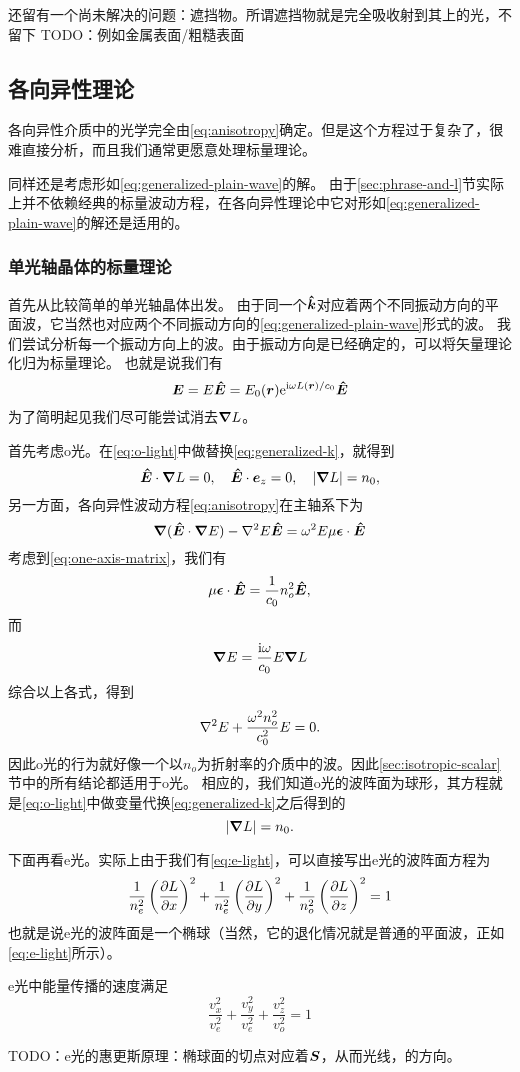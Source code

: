 \documentclass[UTF8, a4paper]{ctexart}
\newcommand*{\ii}{\mathrm{i}}
\newcommand*{\ee}{\mathrm{e}}
\begin{document}
还留有一个尚未解决的问题：遮挡物。所谓遮挡物就是完全吸收射到其上的光，不留下
TODO：例如金属表面/粗糙表面

\subsection{各向异性理论}

各向异性介质中的光学完全由\eqref{eq:anisotropy}确定。但是这个方程过于复杂了，很难直接分析，而且我们通常更愿意处理标量理论。

同样还是考虑形如\eqref{eq:generalized-plain-wave}的解。
由于\ref{sec:phrase-and-l}节实际上并不依赖经典的标量波动方程，在各向异性理论中它对形如\eqref{eq:generalized-plain-wave}的解还是适用的。

\subsubsection{单光轴晶体的标量理论}

首先从比较简单的单光轴晶体出发。
由于同一个$\vu*{k}$对应着两个不同振动方向的平面波，它当然也对应两个不同振动方向的\eqref{eq:generalized-plain-wave}形式的波。
我们尝试分析每一个振动方向上的波。由于振动方向是已经确定的，可以将矢量理论化归为标量理论。
也就是说我们有
\[
    \vb*{E} = E \vu*{E} = E_0(\vb*{r}) \ee^{\ii \omega L(\vb*{r}) / c_0} \vu*{E}
\]
为了简明起见我们尽可能尝试消去$\grad{L}$。

首先考虑o光。在\eqref{eq:o-light}中做替换\eqref{eq:generalized-k}，就得到
\[
    \vu*{E} \cdot \grad{L} = 0, \quad \vu*{E} \cdot \vb*{e}_z = 0, \quad \abs{\grad{L}} = n_0,
\]
另一方面，各向异性波动方程\eqref{eq:anisotropy}在主轴系下为
\[
    \grad{(\vu*{E} \cdot \grad{E})} - \laplacian E \vu*{E} = \omega^2 E \mu \vb*{\epsilon} \cdot \vu*{E}
\]
考虑到\eqref{eq:one-axis-matrix}，我们有
\[
    \mu \vb*{\epsilon} \cdot \vu*{E} = \frac{1}{c_0} n_o^2 \vu*{E},
\]
而
\[
    \grad{E} = \frac{\ii \omega}{c_0} E \grad{L}
\]
综合以上各式，得到
\begin{equation}
    \laplacian E + \frac{\omega^2 n_o^2}{c_0^2} E = 0.
    \label{eq:o-light-wave-eq}
\end{equation}
因此o光的行为就好像一个以$n_o$为折射率的介质中的波。因此\ref{sec:isotropic-scalar}节中的所有结论都适用于o光。
相应的，我们知道o光的波阵面为球形，其方程就是\eqref{eq:o-light}中做变量代换\eqref{eq:generalized-k}之后得到的
\begin{equation}
    \abs{\grad{L}} = n_0.
\end{equation}

下面再看e光。实际上由于我们有\eqref{eq:e-light}，可以直接写出e光的波阵面方程为
\begin{equation}
    \frac{1}{n_e^2} \left( \pdv{L}{x} \right)^2 + \frac{1}{n_e^2} \left( \pdv{L}{y} \right)^2 + \frac{1}{n_o^2} \left( \pdv{L}{z} \right)^2 = 1
\end{equation}
也就是说e光的波阵面是一个椭球（当然，它的退化情况就是普通的平面波，正如\eqref{eq:e-light}所示）。

e光中能量传播的速度满足
\begin{equation}
    \frac{v_x^2}{v_e^2} + \frac{v_y^2}{v_e^2} + \frac{v_z^2}{v_o^2} = 1
\end{equation}

TODO：e光的惠更斯原理：椭球面的切点对应着$\vb*{S}$，从而光线，的方向。
\end{document}
